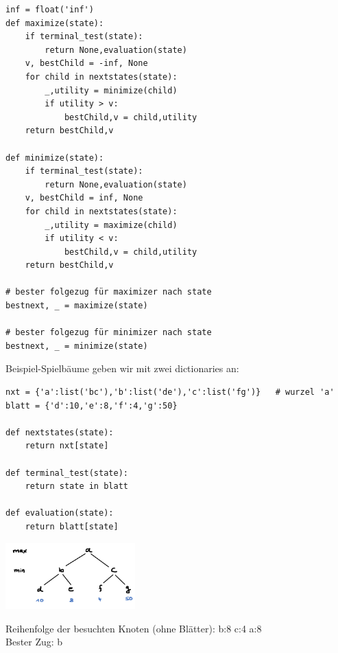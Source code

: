 \documentclass{beamer}
\begin{document}
\begin{frame}[fragile]
\begin{lstlisting}[basicstyle=\tiny]
inf = float('inf')
def maximize(state):
    if terminal_test(state):
        return None,evaluation(state)
    v, bestChild = -inf, None
    for child in nextstates(state):
        _,utility = minimize(child)
        if utility > v:
            bestChild,v = child,utility
    return bestChild,v

def minimize(state):
    if terminal_test(state):
        return None,evaluation(state)
    v, bestChild = inf, None
    for child in nextstates(state):
        _,utility = maximize(child)
        if utility < v:
            bestChild,v = child,utility
    return bestChild,v

# bester folgezug für maximizer nach state
bestnext, _ = maximize(state)

# bester folgezug für minimizer nach state
bestnext, _ = minimize(state)
\end{lstlisting} 
\end{frame}

\begin{frame}[fragile]
 
Beispiel-Spielbäume geben wir mit zwei dictionaries an:
\begin{lstlisting}[basicstyle=\tiny]
nxt = {'a':list('bc'),'b':list('de'),'c':list('fg')}   # wurzel 'a'
blatt = {'d':10,'e':8,'f':4,'g':50}
 
def nextstates(state):
    return nxt[state]
        
def terminal_test(state):
    return state in blatt

def evaluation(state):
    return blatt[state]
\end{lstlisting} 

\pause
\includegraphics[width=5cm]{minmax_folie01.png} 

Reihenfolge der besuchten Knoten (ohne Blätter):  b:8 c:4 a:8 \\
Bester Zug: b
\end{frame}
\end{document}
